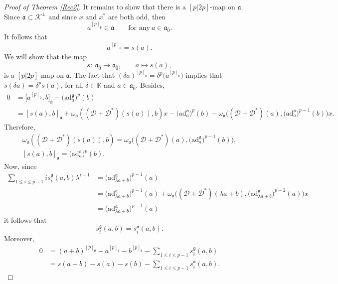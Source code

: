 \documentclass[10pt,a4paper]{amsart}
\numberwithin{equation}{section}
\begin{document}
\begin{proof}[Proof of Theorem \ref{Rec2}]
It remains to show that there is a $[p|2p]$-map on $\mathfrak{a}$. Since $\mathfrak{a} \subset \mathscr{K}^\perp$ and since $x$ and $x^*$ are both odd, then
\[
a^{[p]_\mathfrak{g}}\in \mathfrak{a} \qquad \text{for any}\ a \in \mathfrak{a}_{\bar 0}.
\]
It follows that
\begin{equation*}
a^{[p]_\mathfrak{g}}=s(a).
\end{equation*}
We will show that the map
\[
s\colon\ \mathfrak{a}_{\bar 0} \rightarrow \mathfrak{a}_{\bar 0}, \qquad a\mapsto s(a),
\]
is a $[p|2p]$-map on $\mathfrak{a}$.
The fact that $(\delta a)^{[p]_\mathfrak{g}}=\delta^p\bigl(a^{[p]_\mathfrak{g}}\bigr)$ implies that $s(\delta a)=\delta^p s(a)$, for all $\delta\in \mathbb K$ and $a\in \mathfrak{a}_{\bar 0}$. Besides,
\begin{align*}
0&=\big[a^{[p]_\mathfrak{g}},b\big]_\mathfrak{g}-\bigl(\mathrm{ad}_a^\mathfrak{g}\bigr)^{p}(b)\\
&=[s(a),b]_\mathfrak{a}+\omega_\mathfrak{a}(({\mathscr D} + {\mathscr D}^*)(s(a)), b) x -\bigl(\mathrm{ad}_a^\mathfrak{a}\bigr)^p(b)- \omega_\mathfrak{a}\bigl(({\mathscr D} + {\mathscr D}^*)(a),\bigl(\mathrm{ad}_a^\mathfrak{a}\bigr)^{p-1}(b)\bigr) x.
\end{align*}
Therefore,
\begin{gather*}
\omega_\mathfrak{a}(({\mathscr D}+{\mathscr D}^*)(s(a)), b) = \omega_\mathfrak{a}\bigl(({\mathscr D}+{\mathscr D}^*)(a),\bigl(\mathrm{ad}_a^\mathfrak{a}\bigr)^{p-1}(b)\bigr),\\
[s(a),b]_\mathfrak{a} =\bigl(\mathrm{ad}_a^\mathfrak{a}\bigr)^p(b).
\end{gather*}
Now, since
\begin{align*}
 \sum_{1\leq i \leq p-1} is_i^\mathfrak{g}(a,b) \lambda^{i-1}&=\bigl(\mathrm{ad}_{\lambda a+b}^\mathfrak{g}\bigr)^{p-1}(a)\\
&=\bigl(\mathrm{ad}_{\lambda a+b}^\mathfrak{a}\bigr)^{p-1}(a)+\omega_\mathfrak{a}\bigl(({\mathscr D}+{\mathscr D}^*)(\lambda a+b),\bigl(\mathrm{ad}_{\lambda a+b}^\mathfrak{a}\bigr)^{p-2}(a) \bigr)x\\
&= \bigl(\mathrm{ad}_{\lambda a+b}^\mathfrak{a}\bigr)^{p-1}(a)
\end{align*}
it follows that
\[
s^\mathfrak{g}_i(a,b)=s_i^{\mathfrak{a}}(a,b).
\]
Moreover,
\begin{align*}
0&=(a+b)^{[p]_\mathfrak{g}}-a^{[p]_\mathfrak{g}}-b^{[p]_\mathfrak{g}}- \sum_{1\leq i \leq p-1}s_i^\mathfrak{g}(a,b)\\
&=s(a+b)-s(a)-s(b)- \sum_{1\leq i \leq p-1}s_i^{\mathfrak{a}}(a,b).

\end{align*}
\end{proof}
\end{document}
